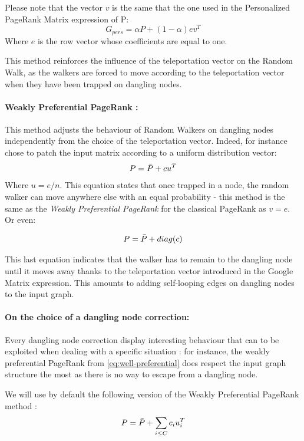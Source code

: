 \documentclass[sn-mathphys]{sn-jnl}%
\theoremstyle{thmstyleone}%
\theoremstyle{thmstyletwo}%
\theoremstyle{thmstylethree}%
\begin{document}
Please note that the vector $v$ is the same that the one used in the
Personalized PageRank Matrix expression of P:
\begin{equation}
    G_{pers} = \alpha P + (1-\alpha)ev^T
\end{equation}
Where $e$ is the row vector whose coefficients are equal to one.

This method reinforces the influence of the teleportation vector on
the Random Walk, as the walkers are forced to move according to the
teleportation vector when they have been trapped on dangling nodes.

\paragraph{Weakly Preferential PageRank \cite{gleich_2015}:}
This method adjusts the behaviour of Random Walkers on dangling nodes
independently from the choice of the teleportation vector. Indeed, for
instance \cite{langville_meyer_2004} chose to patch the input matrix
according to a uniform distribution vector:
\begin{equation}
    P = \Bar{P} + cu^T
\end{equation}
Where $u= e/n$. This equation states that once trapped in a node, the
random walker can move anywhere else with an equal probability - this
method is the same as the \textit{Weakly Preferential PageRank} for
the classical PageRank as $v = e$. Or even:

\begin{equation}\label{eq:well-preferential}
    P = \Bar{P} + diag(c)
\end{equation}

This last equation indicates that the walker has to remain to the
dangling node until it moves away thanks to the teleportation vector
introduced in the Google Matrix expression. This amounts to adding
self-looping edges on dangling nodes to the input graph.

\paragraph{On the choice of a dangling node correction:}
Every dangling node correction display interesting behaviour that can to be exploited when dealing with a specific situation : for instance, the weakly preferential PageRank from \ref{eq:well-preferential} does respect the input graph structure the most as there is no way to escape from a dangling node.

We will use by default the following version of the Weakly
Preferential PageRank method :
\begin{equation}
    P = \Bar{P} + \sum_{i\leq C} c_{i} u_{i}^T
\end{equation}
\end{document}
